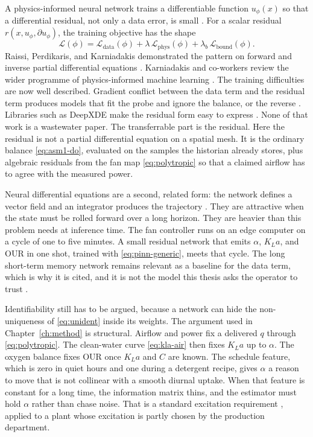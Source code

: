 A physics-informed neural network trains a differentiable function $u_{\phi}(x)$ so that a differential residual, not only a data error, is small \cite{raissi2019pinn,karniadakis2021piml}. For a scalar residual $r(x,u_{\phi},\partial u_{\phi})$, the training objective has the shape
\begin{equation}
\label{eq:pinn-generic}
\mathcal{L}(\phi)
=
\mathcal{L}_{\mathrm{data}}(\phi)
+
\lambda\,
\mathcal{L}_{\mathrm{phys}}(\phi)
+
\lambda_{b}\,
\mathcal{L}_{\mathrm{bound}}(\phi).
\end{equation}
Raissi, Perdikaris, and Karniadakis demonstrated the pattern on forward and inverse partial differential equations \cite{raissi2019pinn}. Karniadakis and co-workers review the wider programme of physics-informed machine learning \cite{karniadakis2021piml}. The training difficulties are now well described. Gradient conflict between the data term and the residual term produces models that fit the probe and ignore the balance, or the reverse \cite{wang2021gradient,cuomo2022}. Libraries such as DeepXDE make the residual form easy to express \cite{lu2021deepxde}. None of that work is a wastewater paper. The transferrable part is the residual. Here the residual is not a partial differential equation on a spatial mesh. It is the ordinary balance \eqref{eq:asm1-do}, evaluated on the samples the historian already stores, plus algebraic residuals from the fan map \eqref{eq:polytropic} so that a claimed airflow has to agree with the measured power.

Neural differential equations are a second, related form: the network defines a vector field and an integrator produces the trajectory \cite{chen2018node,hochreiter1997lstm,goodfellow2016deep}. They are attractive when the state must be rolled forward over a long horizon. They are heavier than this problem needs at inference time. The fan controller runs on an edge computer on a cycle of one to five minutes. A small residual network that emits $\alpha$, $K_La$, and $\mathrm{OUR}$ in one shot, trained with \eqref{eq:pinn-generic}, meets that cycle. The long short-term memory network remains relevant as a baseline for the data term, which is why it is cited, and it is not the model this thesis asks the operator to trust \cite{hochreiter1997lstm}.

Identifiability still has to be argued, because a network can hide the non-uniqueness of \eqref{eq:unident} inside its weights. The argument used in Chapter~\ref{ch:method} is structural. Airflow and power fix a delivered $q$ through \eqref{eq:polytropic}. The clean-water curve \eqref{eq:kla-air} then fixes $K_La$ up to $\alpha$. The oxygen balance fixes $\mathrm{OUR}$ once $K_La$ and $C$ are known. The schedule feature, which is zero in quiet hours and one during a detergent recipe, gives $\alpha$ a reason to move that is not collinear with a smooth diurnal uptake. When that feature is constant for a long time, the information matrix thins, and the estimator must hold $\alpha$ rather than chase noise. That is a standard excitation requirement \cite{ljung1999}, applied to a plant whose excitation is partly chosen by the production department.

